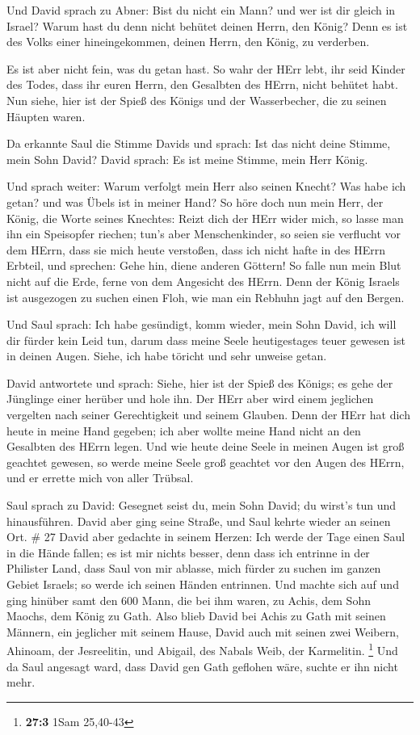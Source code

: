  Und David sprach zu Abner: Bist du nicht ein Mann? und wer
ist dir gleich in Israel? Warum hast du denn nicht behütet deinen Herrn,
den König? Denn es ist des Volks einer hineingekommen, deinen Herrn, den
König, zu verderben.

 Es ist aber nicht fein, was du getan hast. So wahr der
HErr lebt, ihr seid Kinder des Todes, dass ihr euren Herrn, den
Gesalbten des HErrn, nicht behütet habt. Nun siehe, hier ist der Spieß
des Königs und der Wasserbecher, die zu seinen Häupten waren.

 Da erkannte Saul die Stimme Davids und sprach: Ist das
nicht deine Stimme, mein Sohn David? David sprach: Es ist meine Stimme,
mein Herr König.

 Und sprach weiter: Warum verfolgt mein Herr also seinen
Knecht? Was habe ich getan? und was Übels ist in meiner Hand?
 So höre doch nun mein Herr, der König, die Worte seines
Knechtes: Reizt dich der HErr wider mich, so lasse man ihn ein
Speisopfer riechen; tun's aber Menschenkinder, so seien sie verflucht
vor dem HErrn, dass sie mich heute verstoßen, dass ich nicht hafte in
des HErrn Erbteil, und sprechen: Gehe hin, diene anderen Göttern!
 So falle nun mein Blut nicht auf die Erde, ferne von dem
Angesicht des HErrn. Denn der König Israels ist ausgezogen zu suchen
einen Floh, wie man ein Rebhuhn jagt auf den Bergen.

 Und Saul sprach: Ich habe gesündigt, komm wieder, mein
Sohn David, ich will dir fürder kein Leid tun, darum dass meine Seele
heutigestages teuer gewesen ist in deinen Augen. Siehe, ich habe töricht
und sehr unweise getan.

 David antwortete und sprach: Siehe, hier ist der Spieß des
Königs; es gehe der Jünglinge einer herüber und hole ihn. 
Der HErr aber wird einem jeglichen vergelten nach seiner Gerechtigkeit
und seinem Glauben. Denn der HErr hat dich heute in meine Hand gegeben;
ich aber wollte meine Hand nicht an den Gesalbten des HErrn legen.
 Und wie heute deine Seele in meinen Augen ist groß
geachtet gewesen, so werde meine Seele groß geachtet vor den Augen des
HErrn, und er errette mich von aller Trübsal.

 Saul sprach zu David: Gesegnet seist du, mein Sohn David;
du wirst's tun und hinausführen. David aber ging seine Straße, und Saul
kehrte wieder an seinen Ort. \# 27  David aber gedachte in
seinem Herzen: Ich werde der Tage einen Saul in die Hände fallen; es ist
mir nichts besser, denn dass ich entrinne in der Philister Land, dass
Saul von mir ablasse, mich fürder zu suchen im ganzen Gebiet Israels; so
werde ich seinen Händen entrinnen.  Und machte sich auf und
ging hinüber samt den 600 Mann, die bei ihm waren, zu Achis, dem Sohn
Maochs, dem König zu Gath.  Also blieb David bei Achis zu
Gath mit seinen Männern, ein jeglicher mit seinem Hause, David auch mit
seinen zwei Weibern, Ahinoam, der Jesreelitin, und Abigail, des Nabals
Weib, der Karmelitin. \footnote{\textbf{27:3} 1Sam 25,40-43}
 Und da Saul angesagt ward, dass David gen Gath geflohen
wäre, suchte er ihn nicht mehr.

